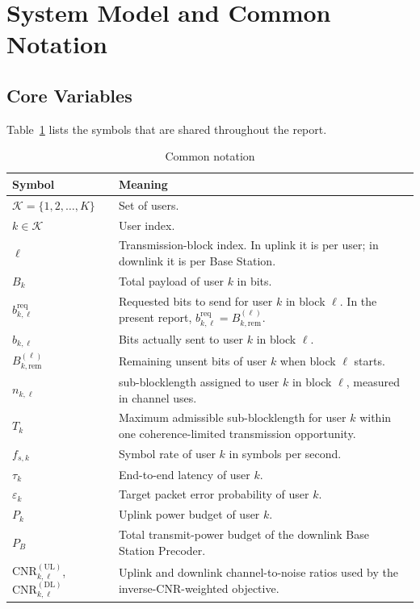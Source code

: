 \documentclass[11pt]{article}
\newcommand{\Kset}{\mathcal{K}}
\newcommand{\UL}{\mathrm{UL}}
\newcommand{\DL}{\mathrm{DL}}
\newcommand{\CNR}{\mathrm{CNR}}
\begin{document}
\section{System Model and Common Notation}

\subsection{Core Variables}

Table~\ref{tab:common-notation} lists the symbols that are shared throughout
the report.

\begin{table}[ht]
\centering
\small
\caption{Common notation}
\label{tab:common-notation}
\renewcommand{\arraystretch}{1.15}
\begin{tabularx}{\textwidth}{>{\raggedright\arraybackslash}p{} X}
\toprule
Symbol & Meaning \\
\midrule
$\Kset = \{1,2,\dots,K\}$ & Set of users. \\
$k \in \Kset$ & User index. \\
$\ell$ & Transmission-block index. In uplink it is per user; in downlink it is per Base Station. \\
$B_k$ & Total payload of user $k$ in bits. \\
$b_{k,\ell}^{\mathrm{req}}$ & Requested bits to send for user $k$ in block $\ell$. In the present report, $b_{k,\ell}^{\mathrm{req}} = B_{k,\mathrm{rem}}^{(\ell)}$. \\
$b_{k,\ell}$ & Bits actually sent to user $k$ in block $\ell$. \\
$B_{k,\mathrm{rem}}^{(\ell)}$ & Remaining unsent bits of user $k$ when block $\ell$ starts. \\
$n_{k,\ell}$ & sub-blocklength assigned to user $k$ in block $\ell$, measured in channel uses. \\
$T_k$ & Maximum admissible sub-blocklength for user $k$ within one coherence-limited transmission opportunity. \\
$f_{s,k}$ & Symbol rate of user $k$ in symbols per second. \\
$\tau_k$ & End-to-end latency of user $k$. \\
$\varepsilon_k$ & Target packet error probability of user $k$. \\
$P_k$ & Uplink power budget of user $k$. \\
$P_B$ & Total transmit-power budget of the downlink Base Station Precoder. \\
$\CNR_{k,\ell}^{(\UL)}$, $\CNR_{k,\ell}^{(\DL)}$ & Uplink and downlink channel-to-noise ratios used by the inverse-CNR-weighted objective. \\

\end{tabularx}
\end{table}
\end{document}
